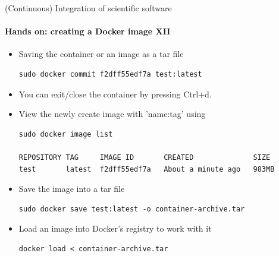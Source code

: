 \begin{frame}[fragile]{(Continuous) Integration of scientific software} 
    \framesubtitle{Hands on: creating a Docker image XII} 
    \vfill

    \begin{itemize}
        \item Saving the container or an image as a tar file 

    \begin{verbatim}
sudo docker commit f2dff55edf7a test:latest
    \end{verbatim}

        \item You can exit/close the container by pressing Ctrl+d.

        \item View the newly create image with 'name:tag' using 

    \begin{verbatim}
sudo docker image list 

REPOSITORY TAG     IMAGE ID       CREATED              SIZE
test       latest  f2dff55edf7a   About a minute ago   983MB
    \end{verbatim}

    \item Save the image into a tar file 

    \begin{verbatim}
sudo docker save test:latest -o container-archive.tar
    \end{verbatim}

    \item Load an image into Docker's registry to work with it 

    \begin{verbatim}
docker load < container-archive.tar
    \end{verbatim}

\end{itemize}

\end{frame}


